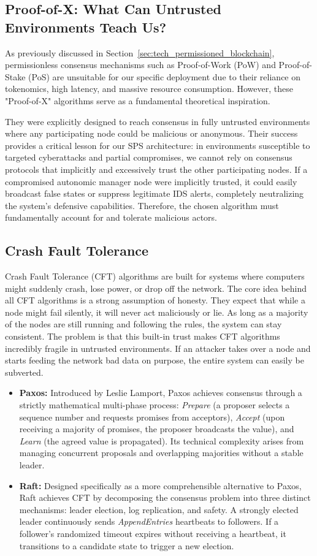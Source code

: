 \subsection{Proof-of-X: What Can Untrusted Environments Teach Us?}
As previously discussed in Section~\ref{sec:tech_permissioned_blockchain}, permissionless consensus mechanisms such as Proof-of-Work (PoW) and Proof-of-Stake (PoS) are unsuitable for our specific deployment due to their reliance on tokenomics, high latency, and massive resource consumption. However, these "Proof-of-X" algorithms serve as a fundamental theoretical inspiration. 

They were explicitly designed to reach consensus in fully untrusted environments where any participating node could be malicious or anonymous. Their success provides a critical lesson for our SPS architecture: in environments susceptible to targeted cyberattacks and partial compromises, we cannot rely on consensus protocols that implicitly and excessively trust the other participating nodes. If a compromised autonomic manager node were implicitly trusted, it could easily broadcast false states or suppress legitimate IDS alerts, completely neutralizing the system's defensive capabilities. Therefore, the chosen algorithm must fundamentally account for and tolerate malicious actors.

\subsection{Crash Fault Tolerance}
Crash Fault Tolerance (CFT) algorithms are built for systems where computers might suddenly crash, lose power, or drop off the network. The core idea behind all CFT algorithms is a strong assumption of honesty. They expect that while a node might fail silently, it will never act maliciously or lie. As long as a majority of the nodes are still running and following the rules, the system can stay consistent. The problem is that this built-in trust makes CFT algorithms incredibly fragile in untrusted environments. If an attacker takes over a node and starts feeding the network bad data on purpose, the entire system can easily be subverted.
\begin{itemize}
    \item \textbf{Paxos:} Introduced by Leslie Lamport, Paxos achieves consensus through a strictly mathematical multi-phase process: \textit{Prepare} (a proposer selects a sequence number and requests promises from acceptors), \textit{Accept} (upon receiving a majority of promises, the proposer broadcasts the value), and \textit{Learn} (the agreed value is propagated). Its technical complexity arises from managing concurrent proposals and overlapping majorities without a stable leader.
    \item \textbf{Raft:} Designed specifically as a more comprehensible alternative to Paxos, Raft achieves CFT by decomposing the consensus problem into three distinct mechanisms: leader election, log replication, and safety. A strongly elected leader continuously sends \textit{AppendEntries} heartbeats to followers. If a follower's randomized timeout expires without receiving a heartbeat, it transitions to a candidate state to trigger a new election.
\end{itemize}

